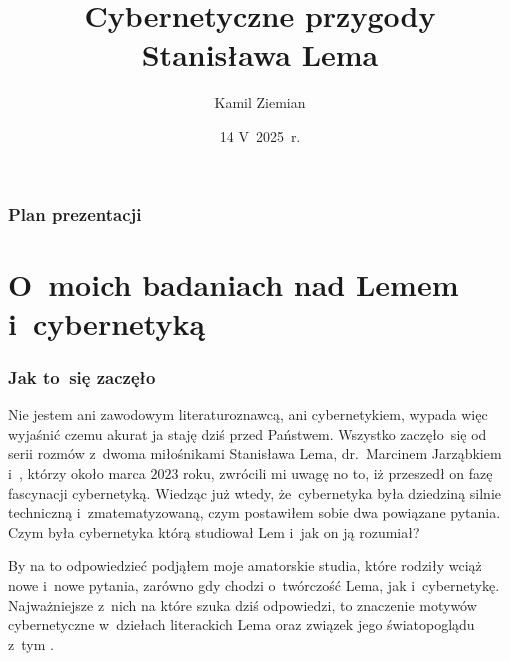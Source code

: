 \documentclass[10pt,t]{beamer}
\title{Cybernetyczne przygody Stanisława Lema}
\author{Kamil Ziemian \\
  \email}
\date[14 V~2025~r.]{14 V~2025~r.}
\begin{document}





\RaggedRight





\maketitle





\begin{frame}
  \frametitle{Plan prezentacji}


  \tableofcontents

\end{frame}










\section{O~moich badaniach nad Lemem i~cybernetyką}



\begin{frame}
  \frametitle{Jak to~się zaczęło}


  Nie jestem ani zawodowym literaturoznawcą, ani cybernetykiem, wypada więc
  wyjaśnić czemu akurat ja staję dziś przed Państwem. Wszystko
  zaczęło~się od serii rozmów z~dwoma miłośnikami Stanisława Lema,
  {dr.~Marcinem Jarząbkiem}
  i~, którzy około marca $2023$ roku, zwrócili mi uwagę no to,
  iż przeszedł on fazę fascynacji cybernetyką. Wiedząc już wtedy,
  że~cybernetyka była dziedziną silnie techniczną i~zmatematyzowaną, czym
  postawiłem sobie dwa powiązane pytania. Czym była cybernetyka którą
  studiował Lem i~jak on ją rozumiał?

  By na to odpowiedzieć podjąłem moje amatorskie studia, które
  rodziły wciąż nowe i~nowe pytania, zarówno gdy chodzi o~twórczość Lema,
  jak i~cybernetykę. Najważniejsze z~nich na które szuka dziś odpowiedzi, to
  znaczenie motywów cybernetyczne w~dziełach literackich Lema oraz związek
  jego światopoglądu z~tym
  .

\end{frame}
\end{document}

